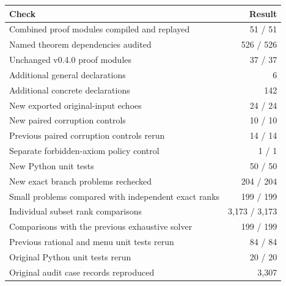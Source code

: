 \begin{center}\begin{tabularx}{\linewidth}{@{}Xr@{}}\toprule Check & Result\\\midrule

Combined proof modules compiled and replayed & 51 / 51\\

Named theorem dependencies audited & 526 / 526\\

Unchanged v0.4.0 proof modules & 37 / 37\\

Additional general declarations & 6\\

Additional concrete declarations & 142\\

New exported original-input echoes & 24 / 24\\

New paired corruption controls & 10 / 10\\

Previous paired corruption controls rerun & 14 / 14\\

Separate forbidden-axiom policy control & 1 / 1\\

New Python unit tests & 50 / 50\\

New exact branch problems rechecked & 204 / 204\\

Small problems compared with independent exact ranks & 199 / 199\\

Individual subset rank comparisons & 3,173 / 3,173\\

Comparisons with the previous exhaustive solver & 199 / 199\\

Previous rational and menu unit tests rerun & 84 / 84\\

Original Python unit tests rerun & 20 / 20\\

Original audit case records reproduced & 3,307\\

\bottomrule\end{tabularx}\end{center}

